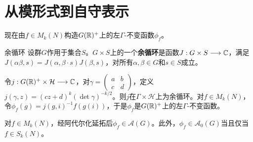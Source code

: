 \section{从模形式到自守表示}\label{L6S2}
现在由$f\in M_k(N)$构造$G(\mathbb{R})^+$上的左$\Gamma$-不变函数$\phi_f$。
\begin{definition}{余循环}\label{L6S2O1}
设群$G$作用于集合$S$。$G\times S$上的一个\textbf{余循环}是函数$J:G\times S\longrightarrow\mathbb{C}$，满足$J(\alpha\beta,s)=J(\alpha,\beta\cdot s)J(\beta,s)$，对所有$\alpha,\beta\in G$和$s\in S$成立。
\end{definition}
令$j:G(\mathbb{R})^+\times\mathcal H\longrightarrow\mathbb{C}$，对$\gamma=\begin{pmatrix}a&b\\c&d\end{pmatrix}$，定义$j(\gamma,z)=(cz+d)^k(\det\gamma)^{-k/2}$。则$j$在$\Gamma\times\mathcal H$上为余循环。对$f\in M_k(N)$，令$\phi_f(g)=j(g,i)^{-1}f(g(i))$，于是$\phi_f$是$G(\mathbb{R})^+$上的左$\Gamma$-不变函数。
\begin{lemma}\label{L6S2O2}
对$f\in M_k(N)$，经阿代尔化延拓后$\phi_f\in\mathcal A(G)$。此外，$\phi_f\in\mathcal A_0(G)$当且仅当$f\in S_k(N)$。
\end{lemma}
